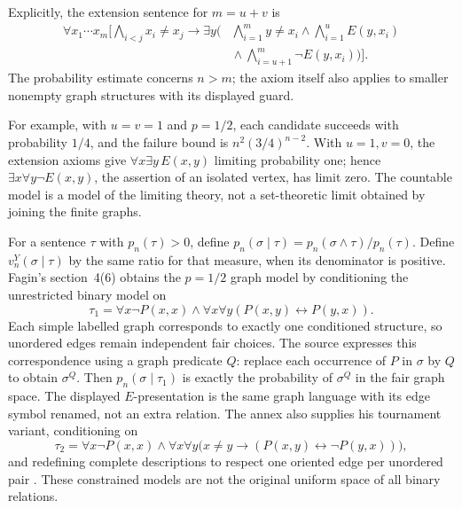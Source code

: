 Explicitly, the extension sentence for \(m=u+v\) is
\[
\begin{split}
 \forall x_1\cdots x_m\biggl[\bigwedge_{i<j}x_i\ne x_j
 \to\exists y\biggl(&\bigwedge_{i=1}^m y\ne x_i
     \land\bigwedge_{i=1}^u E(y,x_i)\\
     &{}\land\bigwedge_{i=u+1}^m\neg E(y,x_i)\biggr)\biggr].
\end{split}
\]
The probability estimate concerns \(n>m\); the axiom itself also
applies to smaller nonempty graph structures with its displayed guard.

For example, with \(u=v=1\) and \(p=1/2\), each candidate succeeds
with probability \(1/4\), and the failure bound is
\(n^2(3/4)^{n-2}\).  With \(u=1,v=0\), the extension axioms give
\(\forall x\exists y\,E(x,y)\) limiting probability one; hence
\(\exists x\forall y\neg E(x,y)\), the assertion of an isolated
vertex, has limit zero.  The countable model is a model of the limiting
theory, not a set-theoretic limit obtained by joining the finite graphs.

For a sentence \(\tau\) with \(p_n(\tau)>0\), define
\(p_n(\sigma\mid\tau)=p_n(\sigma\land\tau)/p_n(\tau)\).
Define \(v_n^Y(\sigma\mid\tau)\) by the same ratio for that
measure, when its denominator is positive.  Fagin's section~4(6)
obtains the \(p=1/2\) graph model by conditioning
the unrestricted binary model on
\[
 \tau_1=\forall x\neg P(x,x)\land
             \forall x\forall y(P(x,y)\leftrightarrow P(y,x)).
\]
Each simple labelled graph corresponds to exactly one conditioned
structure, so unordered edges remain independent fair choices.  The
source expresses this correspondence using a graph predicate \(Q\):
replace each occurrence of \(P\) in \(\sigma\) by \(Q\) to
obtain \(\sigma^Q\).  Then \(p_n(\sigma\mid\tau_1)\) is
exactly the probability of \(\sigma^Q\) in the fair graph space.
The displayed \(E\)-presentation is the same graph language with
its edge symbol renamed, not an extra relation.  The
annex also supplies his tournament variant, conditioning on
\[
 \tau_2=\forall x\neg P(x,x)\land
  \forall x\forall y\bigl(x\ne y\to
             (P(x,y)\leftrightarrow\neg P(y,x))\bigr),
\]
and redefining complete descriptions to respect one oriented edge per
unordered pair \cite[p.~57]{Fagin1976}.  These constrained models are
not the original uniform space of all binary relations.

